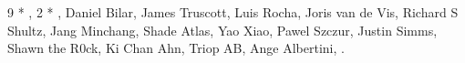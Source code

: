 \subsubsection*{}

9 * , 2 * , Daniel Bilar, James Truscott,
Luis Rocha, Joris van de Vis, Richard S Shultz, Jang Minchang, Shade Atlas, Yao Xiao,
Pawel Szczur, Justin Simms, Shawn the R0ck, Ki Chan Ahn, Triop AB, Ange Albertini,
.
